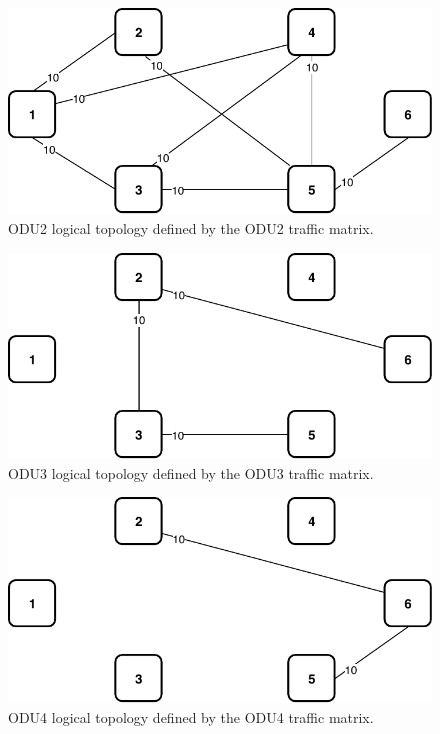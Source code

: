 \begin{figure}[h!]
\centering
\includegraphics[width=12cm]{sdf/ilp/opaque_survivability/figures/logical_topology_ODU2_medium}
\caption{ODU2 logical topology defined by the ODU2 traffic matrix.}
\label{logical_ODU2_medium}
\end{figure}

\begin{figure}[h!]
\centering
\includegraphics[width=12cm]{sdf/ilp/opaque_survivability/figures/logical_topology_ODU3_medium}
\caption{ODU3 logical topology defined by the ODU3 traffic matrix.}
\label{logical_ODU3_medium}
\end{figure}

\begin{figure}[h!]
\centering
\includegraphics[width=12cm]{sdf/ilp/opaque_survivability/figures/logical_topology_ODU4_medium}
\caption{ODU4 logical topology defined by the ODU4 traffic matrix.}
\label{logical_ODU4_medium}
\end{figure}

